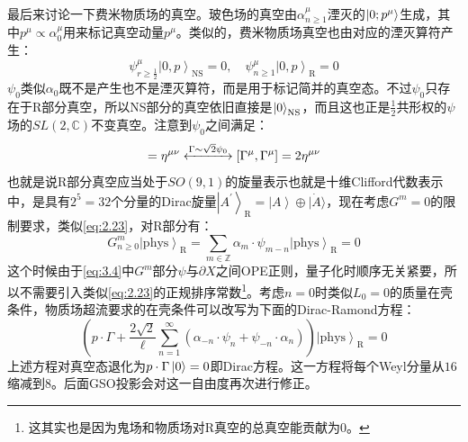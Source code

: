 最后来讨论一下费米物质场的真空。玻色场的真空由$\alpha^\mu_{n\geq 1}$湮灭的$\ket{0;p^\mu}$生成，其中$p^\mu\propto\alpha^\mu_0$用来标记真空动量$p^\mu$。类似的，费米物质场真空也由对应的湮灭算符产生：
\begin{equation}
	\psi_{r\geq\frac12}^\mu\left|0,p\right\rangle_{\mathrm{NS}}=0,\quad \psi_{n\geq1}^\mu\left|0,p\right\rangle_{\mathrm{R}}=0
\end{equation}
$\psi_0$类似$\alpha_0$既不是产生也不是湮灭算符，而是用于标记简并的真空态。不过$\psi_0$只存在于R部分真空，所以NS部分的真空依旧直接是$\ket{0}_{\mathrm{NS}}$，而且这也正是$\frac12$共形权的$\psi$场的$SL(2,\mathbb{C})$不变真空。注意到$\psi_0$之间满足：
\begin{equation}
	[\psi_0^\mu,\psi_0^\nu]=\eta^{\mu\nu}
	\xleftrightarrow{\Gamma\sim\sqrt{2}\psi_0} [\Gamma^\mu,\Gamma^\mu]=2\eta^{\mu\nu}
\end{equation}
也就是说R部分真空应当处于$SO(9,1)$的旋量表示也就是十维Clifford代数表示中，是具有$2^5=32$个分量的Dirac旋量$\left|A^{\prime}\right\rangle_{\mathrm{R}}=\left|A\right\rangle\oplus|\dot A\rangle$，现在考虑$G^m=0$的限制要求，类似\ref{eq:2.23}，对R部分有：
\begin{equation}
	G^m_{n\geq0}\left|\mathrm{phys}\right\rangle_{\mathrm{R}}=\sum_{m\in\mathbb{Z}}\alpha_m\cdot\psi_{m-n}\left|\mathrm{phys}\right\rangle_{\mathrm{R}}=0
\end{equation}
这个时候由于\ref{eq:3.4}中$G^m$部分$\psi$与$\partial X$之间OPE正则，量子化时顺序无关紧要，所以不需要引入类似\ref{eq:2.23}的正规排序常数\footnote{这其实也是因为鬼场和物质场对R真空的总真空能贡献为0。}。考虑$n=0$时类似$L_0=0$的质量在壳条件，物质场超流要求的在壳条件可以改写为下面的Dirac-Ramond方程：
\begin{equation}
	\label{eq:3.10}
	\left(p\cdot\Gamma+\frac{2\sqrt{2}}{\ell}\sum_{n=1}^\infty(\alpha_{-n}\cdot \psi_n+\psi_{-n}\cdot\alpha_n)\right)\left|\mathrm{phys}\right\rangle_{\mathrm{R}}=0
\end{equation}
上述方程对真空态退化为$p\cdot\Gamma\ket{0}=0$即Dirac方程。这一方程将每个Weyl分量从$16$缩减到$8$。后面GSO投影会对这一自由度再次进行修正。

